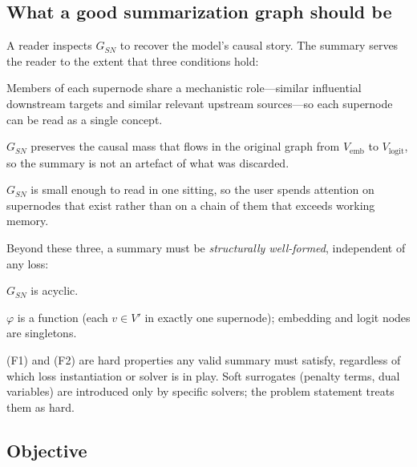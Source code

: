 \subsection{What a good summarization graph should be}\label{sec:desiderata}

A reader inspects $G_{SN}$ to recover the model's causal story. The
summary serves the reader to the extent that three conditions hold:
\begin{description}[leftmargin=2.0em,style=nextline,topsep=2pt,itemsep=2pt]
\item[(D1) Coherence.] Members of each supernode share a mechanistic
role---similar influential downstream targets and similar relevant
upstream sources---so each supernode can be read as a single concept.
\item[(D2) Conservation.] $G_{SN}$ preserves the causal mass that flows
in the original graph from $V_{\text{emb}}$ to $V_{\text{logit}}$, so
the summary is not an artefact of what was discarded.
\item[(D3) Complexity.] $G_{SN}$ is small enough to read in one sitting,
so the user spends attention on supernodes that exist rather than on
a chain of them that exceeds working memory.
\end{description}

Beyond these three, a summary must be \emph{structurally well-formed},
independent of any loss:
\begin{description}[leftmargin=2.0em,style=nextline,topsep=2pt,itemsep=2pt]
\item[(F1) DAG integrity.] $G_{SN}$ is acyclic.
\item[(F2) Partition well-formedness.] $\varphi$ is a function (each
$v \in V'$ in exactly one supernode); embedding and logit nodes are
singletons.
\end{description}
(F1) and (F2) are hard properties any valid summary must satisfy,
regardless of which loss instantiation or solver is in play. Soft
surrogates (penalty terms, dual variables) are introduced only by
specific solvers; the problem statement treats them as hard.

\subsection{Objective}\label{sec:objective}

